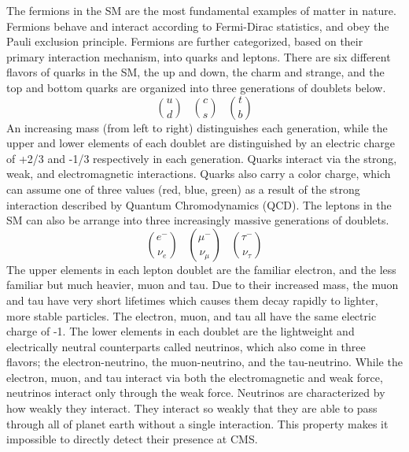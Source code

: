 The fermions in the SM are the most fundamental examples of matter in nature. Fermions behave and interact according to Fermi-Dirac statistics, and obey the Pauli exclusion principle. Fermions are further categorized, based on their primary interaction mechanism,
into quarks and leptons. There are six different flavors of quarks in the SM, the up and down, the charm and strange, and the top and bottom quarks are organized into three generations of doublets below.
\begin{equation}
\binom{u}{d} \;\;\; \binom{c}{s} \;\;\; \binom{t}{b}
\end{equation}
\noindent An increasing mass (from left to right) distinguishes each generation, while the upper and lower elements of each doublet are distinguished by an electric charge of +2/3 and -1/3 respectively in each generation. Quarks interact via the strong, weak, and
electromagnetic interactions. Quarks also carry a color charge, which can assume one of three values (red, blue, green) as a result of the strong interaction described by Quantum Chromodynamics (QCD). The leptons in the SM can also be arrange into three increasingly
massive generations of doublets.
\begin{equation}
\binom{e^{-}}{\nu_{e}} \;\;\; \binom{\mu^{-}}{\nu_{\mu}} \;\;\; \binom{\tau^{-}}{\nu_{\tau}}
\end{equation}
\noindent The upper elements in each lepton doublet are the familiar electron, and the less familiar but much heavier, muon and tau. Due to their increased mass, the muon and tau have very short lifetimes which causes them decay rapidly
to lighter, more stable particles. The electron, muon, and tau all have the same electric charge of -1. The lower elements in each doublet are the lightweight and electrically neutral counterparts called neutrinos, which also come in three
flavors; the electron-neutrino, the muon-neutrino, and the tau-neutrino. While the electron, muon, and tau interact via both the electromagnetic and weak force, neutrinos interact only through the weak force. Neutrinos are characterized by
how weakly they interact. They interact so weakly that they are able to pass through all of planet earth without a single interaction. This property makes it impossible to directly detect their presence at CMS. 

